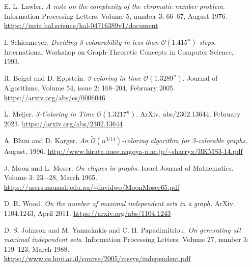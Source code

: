 \begin{thebibliography}{unsrt}

    E. L. Lawler. \emph{A note on the complexity of the chromatic number problem.} Information Processing Letters. Volume 5, number 3: 66--67, August 1976. \url{https://inria.hal.science/hal-04716389v1/document}

    I. Schiermeyer. \emph{Deciding 3-colourability in less than $\mathcal{O}(1.415^n)$ steps.} International Workshop on Graph-Theoretic Concepts in Computer Science, 1993.

    R. Beigel and D. Eppstein. \emph{3-coloring in time $\mathcal{O}(1.3289^n)$}. Journal of Algorithms. Volume 54, issue 2: 168--204, February 2005. \url{https://arxiv.org/abs/cs/0006046}

    L. Meijer. \emph{3-Coloring in Time $\mathcal{O}(1.3217^n)$}. ArXiv. abs/2302.13644, February 2023. \url{https://arxiv.org/abs/2302.13644}

    A. Blum and D. Karger. \emph{An $\mathcal{\widetilde{O}}(n^{3/14})$-coloring algorithm for 3-colorable graphs.} August, 1996. \url{http://www.hirata.nuee.nagoya-u.ac.jp/~sharryx/BKMS3-14.pdf}

    J. Moon and L. Moser. \emph{On cliques in graphs.} Israel Journal of Mathematics. Volume 3: 23–-28, March 1965. \url{https://users.monash.edu.au/~davidwo/MoonMoser65.pdf}

    D. R. Wood. \emph{On the number of maximal independent sets in a graph.} ArXiv. 1104.1243, April 2011. \url{https://arxiv.org/abs/1104.1243}

    D. S. Johnson and M. Yannakakis and C. H. Papadimitriou. \emph{On generating all maximal independent sets}. Information Processing Letters. Volume 27, number 3: 119--123, March 1988. \url{https://www.cs.huji.ac.il/course/2005/mssys/independent.pdf}


\end{thebibliography}
